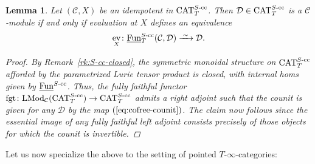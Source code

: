 \documentclass[reqno]{memo-l}
\theoremstyle{mythm}
\newtheorem{lemma}[thm]{Lemma}
\theoremstyle{definition}
\numberwithin{equation}{section}
\newcommand{\Cc}{{\mathcal{C}}}
\newcommand{\Dd}{{\mathcal{D}}}
\DeclareMathOperator{\ev}{ev}
\DeclareMathOperator{\CAT}{CAT}
\newcommand{\Fun}{{\textup{Fun}}}
\newcommand{\fgt}{\textup{fgt}}
\newcommand{\ulhelper}[2]{\underline{\setbox0=\hbox{$#1#2$}\dp0=0.4pt \box0\relax}}
\newcommand{\ul}[1]{{\mathpalette\ulhelper{#1}}\hbox{\rule[-2pt]{0pt}{0pt}}}
\newcommand{\iso}{\xrightarrow{\;\smash{\raisebox{-0.25ex}{\ensuremath{\scriptstyle\sim}}}\;}}
\begin{document}
\begin{lemma}\label{lemma:smash-module-internal-hom}
    Let $(\Cc,X)$ be an idempotent in $\CAT_T^\textup{$S$-cc}$. Then $\Dd\in\CAT_T^\textup{$S$-cc}$ is a $\Cc$-module if and only if evaluation at $X$ defines an equivalence
    \begin{equation}\label{eq:cofree-counit}
        \ev_X\colon\ul\Fun^\textup{$S$-cc}_T(\Cc,\Dd)\iso\Dd.
    \end{equation}
    \begin{proof}
        By Remark~\ref{rk:S-cc-closed}, the symmetric monoidal structure on $\CAT_T^\textup{$S$-cc}$ afforded by the parametrized Lurie tensor product is closed, with internal homs given by $\ul\Fun^\textup{$S$-cc}$.
        Thus, the fully faithful functor $\fgt\colon\text{LMod}_\Cc(\CAT_T^\textup{$S$-cc})\to \CAT_T^\textup{$S$-cc}$ admits a right adjoint such that the counit is given for any $\Dd$ by the map $(\ref{eq:cofree-counit})$.
        The claim now follows since the essential image of any fully faithful left adjoint consists precisely of those objects for which the counit is invertible. 
    \end{proof}
\end{lemma}

Let us now specialize the above to the setting of pointed $T$-$\infty$-categories:
\end{document}
